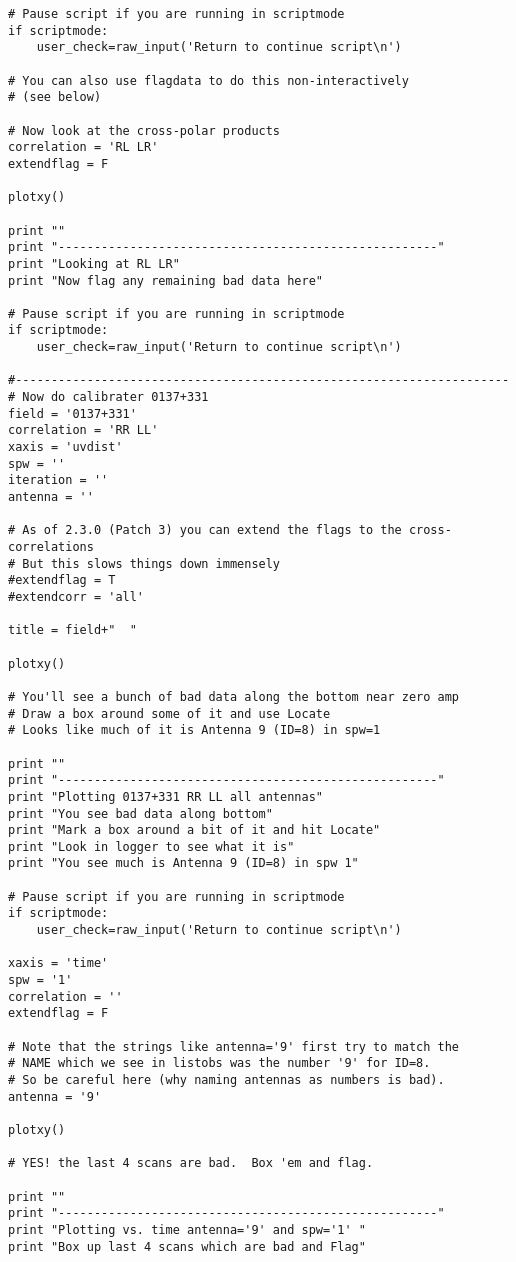 \begin{verbatim}
# Pause script if you are running in scriptmode
if scriptmode:
    user_check=raw_input('Return to continue script\n')

# You can also use flagdata to do this non-interactively
# (see below)

# Now look at the cross-polar products
correlation = 'RL LR'
extendflag = F

plotxy()

print ""
print "-----------------------------------------------------"
print "Looking at RL LR"
print "Now flag any remaining bad data here"

# Pause script if you are running in scriptmode
if scriptmode:
    user_check=raw_input('Return to continue script\n')

#---------------------------------------------------------------------
# Now do calibrater 0137+331
field = '0137+331'
correlation = 'RR LL'
xaxis = 'uvdist'
spw = ''
iteration = ''
antenna = ''

# As of 2.3.0 (Patch 3) you can extend the flags to the cross-correlations
# But this slows things down immensely
#extendflag = T
#extendcorr = 'all'

title = field+"  "

plotxy()

# You'll see a bunch of bad data along the bottom near zero amp
# Draw a box around some of it and use Locate
# Looks like much of it is Antenna 9 (ID=8) in spw=1

print ""
print "-----------------------------------------------------"
print "Plotting 0137+331 RR LL all antennas"
print "You see bad data along bottom"
print "Mark a box around a bit of it and hit Locate"
print "Look in logger to see what it is"
print "You see much is Antenna 9 (ID=8) in spw 1"

# Pause script if you are running in scriptmode
if scriptmode:
    user_check=raw_input('Return to continue script\n')

xaxis = 'time'
spw = '1'
correlation = ''
extendflag = F

# Note that the strings like antenna='9' first try to match the 
# NAME which we see in listobs was the number '9' for ID=8.
# So be careful here (why naming antennas as numbers is bad).
antenna = '9'

plotxy()

# YES! the last 4 scans are bad.  Box 'em and flag.

print ""
print "-----------------------------------------------------"
print "Plotting vs. time antenna='9' and spw='1' "
print "Box up last 4 scans which are bad and Flag"


\end{verbatim}
